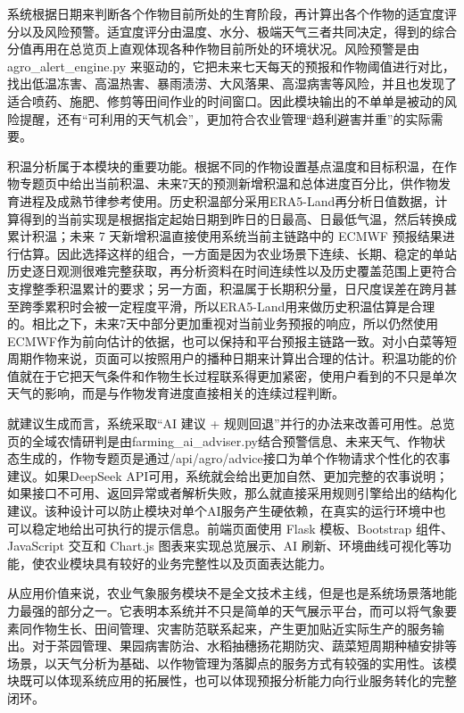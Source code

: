 系统根据日期来判断各个作物目前所处的生育阶段，再计算出各个作物的适宜度评分以及风险预警。适宜度评分由温度、水分、极端天气三者共同决定，得到的综合分值再用在总览页上直观体现各种作物目前所处的环境状况。风险预警是由 agro\_alert\_engine.py 来驱动的，它把未来七天每天的预报和作物阈值进行对比，找出低温冻害、高温热害、暴雨渍涝、大风落果、高湿病害等风险，并且也发现了适合喷药、施肥、修剪等田间作业的时间窗口。因此模块输出的不单单是被动的风险提醒，还有“可利用的天气机会”，更加符合农业管理“趋利避害并重”的实际需要。

积温分析属于本模块的重要功能。根据不同的作物设置基点温度和目标积温，在作物专题页中给出当前积温、未来7天的预测新增积温和总体进度百分比，供作物发育进程及成熟节律参考使用。历史积温部分采用ERA5-Land再分析日值数据，计算得到的当前实现是根据指定起始日期到昨日的日最高、日最低气温，然后转换成累计积温；未来 7 天新增积温直接使用系统当前主链路中的 ECMWF 预报结果进行估算。因此选择这样的组合，一方面是因为农业场景下连续、长期、稳定的单站历史逐日观测很难完整获取，再分析资料在时间连续性以及历史覆盖范围上更符合支撑整季积温累计的要求；另一方面，积温属于长期积分量，日尺度误差在跨月甚至跨季累积时会被一定程度平滑，所以ERA5-Land用来做历史积温估算是合理的。相比之下，未来7天中部分更加重视对当前业务预报的响应，所以仍然使用ECMWF作为前向估计的依据，也可以保持和平台预报主链路一致。对小白菜等短周期作物来说，页面可以按照用户的播种日期来计算出合理的估计。积温功能的价值就在于它把天气条件和作物生长过程联系得更加紧密，使用户看到的不只是单次天气的影响，而是与作物发育进度直接相关的连续过程判断。

就建议生成而言，系统采取“AI 建议 + 规则回退”并行的办法来改善可用性。总览页的全域农情研判是由farming\_ai\_adviser.py结合预警信息、未来天气、作物状态生成的，作物专题页是通过/api/agro/advice接口为单个作物请求个性化的农事建议。如果DeepSeek API可用，系统就会给出更加自然、更加完整的农事说明；如果接口不可用、返回异常或者解析失败，那么就直接采用规则引擎给出的结构化建议。该种设计可以防止模块对单个AI服务产生硬依赖，在真实的运行环境中也可以稳定地给出可执行的提示信息。前端页面使用 Flask 模板、Bootstrap 组件、JavaScript 交互和 Chart.js 图表来实现总览展示、AI 刷新、环境曲线可视化等功能，使农业模块具有较好的业务完整性以及页面表达能力。

从应用价值来说，农业气象服务模块不是全文技术主线，但是也是系统场景落地能力最强的部分之一。它表明本系统并不只是简单的天气展示平台，而可以将气象要素同作物生长、田间管理、灾害防范联系起来，产生更加贴近实际生产的服务输出。对于茶园管理、果园病害防治、水稻抽穗扬花期防灾、蔬菜短周期种植安排等场景，以天气分析为基础、以作物管理为落脚点的服务方式有较强的实用性。该模块既可以体现系统应用的拓展性，也可以体现预报分析能力向行业服务转化的完整闭环。

